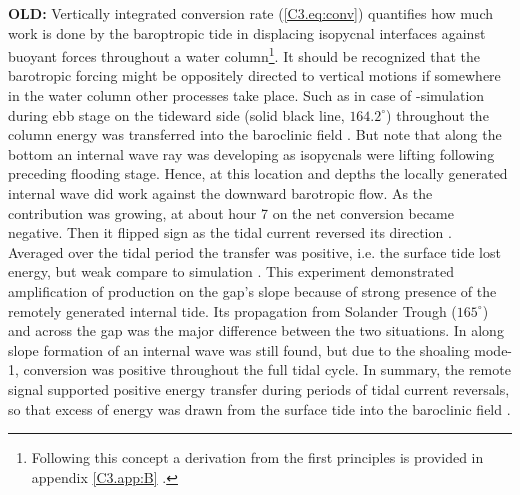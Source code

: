 \documentclass[12pt]{article}
\begin{document}
\textbf{OLD:}
Vertically integrated conversion rate (\ref{C3.eq:conv}) quantifies how much work is done by the 
baroptropic tide in displacing isopycnal interfaces against buoyant forces throughout a water 
column\footnote{Following this concept a derivation from the first principles is provided in 
appendix \ref{C3.app:B} \citep[see also][]{kurapov2003m, kelly2010topo}.}. It should be recognized 
that the barotropic forcing might be oppositely directed to vertical motions if somewhere in the 
water column other processes take place. Such as in case of -simulation 
 during ebb stage on the tideward side (solid black line, 
$164.2^{\circ}$) throughout the column energy was transferred into the baroclinic field 
. But note that along the bottom an internal wave ray was developing as 
isopycnals were lifting following preceding flooding stage. Hence, at this location and depths the 
locally generated internal wave did work against the downward barotropic flow. As the contribution 
was growing, at about hour 7 on  the net conversion became negative. Then 
it flipped sign as the tidal current reversed its direction . Averaged 
over the tidal period the transfer was positive, i.e. the surface tide lost energy, but weak 
compare to  simulation . This experiment demonstrated  
amplification of production on the gap's slope because of strong presence of the remotely generated 
internal tide. Its propagation from Solander Trough ($165^{\circ}$) and across the gap was the 
major 
difference between the two situations. In  along slope formation of an internal wave 
was still found, but due to the shoaling mode-1, conversion was positive throughout the full tidal 
cycle. In summary, the remote signal supported positive energy transfer during periods of tidal 
current reversals, so that excess of energy was drawn from the surface tide into the baroclinic 
field .\\
\end{document}
